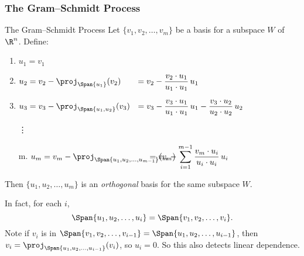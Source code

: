 \begin{frame}
\frametitle{The Gram--Schmidt Process}

\vskip-3mm
\begin{oneoffthm}{The Gram--Schmidt Process}
  Let $\{v_1,v_2,\ldots,v_m\}$ be a basis for a subspace $W$ of $\R^n$.  Define:
  \begin{enumerate}
  \item $u_1 = v_1$
    \pause
  \item $\displaystyle 
    \hbox to 5cm{$u_2 = v_2 - \proj_{\Span\{u_1\}}(v_2)$\hss}
    = v_2 - \frac{v_2\cdot u_1}{u_1\cdot u_1}\,u_1$
    \pause
  \item $\displaystyle 
    \hbox to 5cm{$u_3 = v_3 -\proj_{\Span\{u_1,u_2\}}(v_3)$\hss}
    = v_3 - \frac{v_3\cdot u_1}{u_1\cdot u_1}\,u_1
    - \frac{v_3\cdot u_2}{u_2\cdot u_2}\,u_2$
    \pause
  \item[\vdots]
  \item[m.] $\displaystyle 
    \hbox to 5cm{$u_m = v_m -\proj_{\Span\{u_1,u_2,\ldots,u_{m-1}\}}(v_m)$\hss}
    = v_m - \sum_{i=1}^{m-1}\frac{v_m\cdot u_i}{u_i\cdot u_i}\,u_i$
  \end{enumerate}
  \pause
  Then $\{u_1,u_2,\ldots,u_m\}$ is an \emph{orthogonal} basis for the same
  subspace $W$.
\end{oneoffthm}

\pause\medskip
In fact, for each $i$, 
\[ \Span\{u_1,u_2,\ldots,u_i\} = \Span\{v_1,v_2,\ldots,v_i\}. \]
\pause
Note if $v_i$ is in
$\Span\{v_1,v_2,\ldots,v_{i-1}\} = \Span\{u_1,u_2,\ldots,u_{i-1}\}$,
then $v_i = \proj_{\Span\{u_1,u_2,\ldots,u_{i-1}\}}(v_i)$,
so $u_i = 0$.
\pause
So this also detects linear dependence.

\end{frame}



